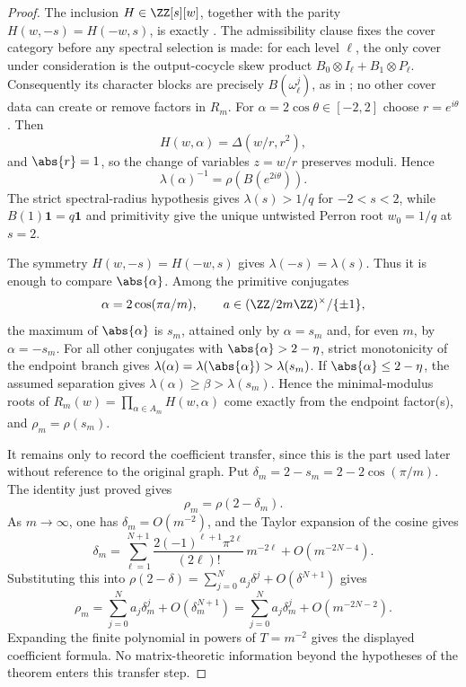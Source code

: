\begin{proof}

The inclusion \(H\in\ZZ[s][w]\), together with the parity
\(H(w,-s)=H(-w,s)\), is exactly . The
admissibility clause fixes the cover category before any spectral
selection is made: for each level \(\ell\), the only cover under consideration is
the output-cocycle skew product \(B_0\otimes I_\ell+B_1\otimes P_\ell\).
Consequently its character blocks are precisely \(B(\omega_\ell^j)\), as
in ; no other cover data can
create or remove factors in \(R_m\).
For \(\alpha=2\cos\theta\in[-2,2]\)
choose \(r=e^{i\theta}\). Then
\[
  H(w,\alpha)=\Delta(w/r,r^2),
\]
and \(\abs{r}=1\), so the change of variables \(z=w/r\) preserves
moduli. Hence
\[
  \lambda(\alpha)^{-1}=\rho(B(e^{2i\theta})).
  \]
The strict spectral-radius hypothesis gives \(\lambda(s)>1/q\) for
\(-2<s<2\), while \(B(1)\mathbf1=q\mathbf1\) and primitivity give the
unique untwisted Perron root \(w_0=1/q\) at \(s=2\).

The symmetry \(H(w,-s)=H(-w,s)\) gives \(\lambda(-s)=\lambda(s)\).
Thus it is enough to compare \(\abs{\alpha}\). Among the primitive
conjugates
\[
  \alpha=2\cos(\pi a/m),
  \qquad a\in(\ZZ/2m\ZZ)^\times/\{\pm1\},
\]
the maximum of \(\abs{\alpha}\) is \(s_m\), attained only by
\(\alpha=s_m\) and, for even \(m\), by \(\alpha=-s_m\). For all other
conjugates with \(\abs{\alpha}>2-\eta\), strict monotonicity of the
endpoint branch gives \(\lambda(\alpha)=\lambda(\abs{\alpha})
>\lambda(s_m)\). If \(\abs{\alpha}\le2-\eta\), the assumed separation
gives \(\lambda(\alpha)\ge\beta>\lambda(s_m)\). Hence the
minimal-modulus roots of \(R_m(w)=\prod_{\alpha\in A_m}H(w,\alpha)\)
come exactly from the endpoint factor(s), and
\(\rho_m=\rho(s_m)\).

  It remains only to record the coefficient transfer, since this is the
  part used later without reference to the original graph. Put
  \(\delta_m=2-s_m=2-2\cos(\pi/m)\). The identity just proved gives
\[
  \rho_m=\rho(2-\delta_m).
\]
As \(m\to\infty\), one has \(\delta_m=O(m^{-2})\), and the Taylor
expansion of the cosine gives
\[
  \delta_m
  =\sum_{\ell=1}^{N+1}
    \frac{2(-1)^{\ell+1}\pi^{2\ell}}{(2\ell)!}\,m^{-2\ell}
    +O(m^{-2N-4}).
\]
Substituting this into
\(\rho(2-\delta)=\sum_{j=0}^N a_j\delta^j+O(\delta^{N+1})\) gives
\[
  \rho_m
  =\sum_{j=0}^N a_j\delta_m^j+O(\delta_m^{N+1})
  =\sum_{j=0}^N a_j\delta_m^j+O(m^{-2N-2}).
\]
Expanding the finite polynomial in powers of \(T=m^{-2}\) gives the
displayed coefficient formula. No matrix-theoretic information beyond
the hypotheses of the theorem enters this transfer step.

\end{proof}

